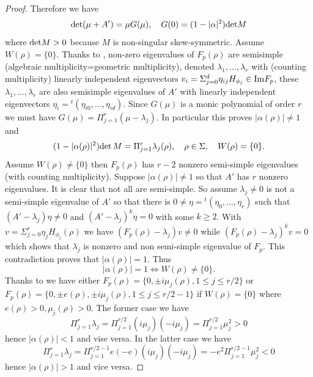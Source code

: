 \documentclass[12pt,leqno]{article} %
\def\al{\alpha}
\numberwithin{equation}{section}
\begin{document}
\begin{proof}
%
Therefore we have
%
\begin{equation}
\label{eq:det:A}
{\rm det}(\mu+A')=\mu G(\mu),\quad G(0)=(1-|\al|^2){\rm det}M
\end{equation}
%
where  ${\rm det}M>0$ because $M$ is non-singular skew-symmetric. 
Assume $W(\rho)=\{0\}$. Thanks to \cite[Lemma 1.4.4 ]{MR492751}, non-zero eigenvalues of $F_p(\rho)$ are semisimple (algebraic multiplicity=geometric multiplicity), denoted  $\lambda_1,\ldots,\lambda_r$ with (counting multiplicity) linearly independent eigenvectors $v_i=\Sigma_{j=0}^d\eta_{ij}H_{\phi_j}\in 
{\rm Im}F_p$, these  $\lambda_1,\ldots,\lambda_r$ are also semisimple eigenvalues of 
$A'$ with linearly independent eigenvectors $\eta_i={^t}(\eta_{i0},\ldots,\eta_{id})$. Since $G(\mu)$ is a monic polynomial of order $r$ we must have $G(\mu)=\Pi_{j=1}^r(\mu-\lambda_j)$. In particular this proves $|\al(\rho)|\neq 1$ and 
%
\begin{equation}
\label{eq:kankei}
(1-|\al(\rho)|^2){\rm det}\,M=\Pi_{j=1}^r \lambda_j(\rho),\quad \rho\in \Sigma,\quad W(\rho)=\{0\}.
\end{equation}
%
Assume $W(\rho)\neq \{0\}$ then $F_p(\rho)$ has $r-2$ nonzero semi-simple eigenvalues (with counting multiplicity). Suppose $|\al(\rho)|\neq 1$ so that $A'$ has $r$ nonzero eigenvalues.
It is clear that not all are semi-simple. So assume  $\lambda_j\neq 0$ is not a semi-simple eigenvalue of $A'$ so that there is $0\neq \eta={^t}(\eta_0,\ldots, \eta_r)$ such that $(A'-\lambda_j)\eta\neq 0$ and $(A'-\lambda_j)^k\eta=0$ with some $k\geq 2$. With $v=\Sigma_{j=0}^r\eta_jH_{\phi_j}(\rho)$ we have $(F_p(\rho)-\lambda_j)v\neq 0$ while $(F_p(\rho)-\lambda_j)^kv= 0$ which shows that $\lambda_j$ is nonzero and non semi-simple eigenvalue of $F_p$. This contradiction proves that $|\al(\rho)|=1$. Thus
%
\begin{equation}
\label{eq:kankei:2}
|\al(\rho)|=1\Longleftrightarrow W(\rho)\neq \{0\}.
\end{equation}
%
Thanks to \cite[Theorem 1.4.6]{MR492751}  we have either $F_p(\rho)=\{0,\pm i\mu_j(\rho), 1\leq j\leq r/2\}$ or $F_p(\rho)=\{0,\pm e(\rho), \pm i\mu_j(\rho), 1\leq j\leq r/2-1\}$ if $W(\rho)=\{0\}$ where $e(\rho)>0, \mu_j(\rho)>0$. The former case we have
%
\[
\Pi_{j=1}^r\lambda_j=\Pi_{j=1}^{r/2}(i\mu_j)(-i\mu_j)=\Pi_{j=1}^{r/2}\mu_j^2>0
\]
%
hence $|\al(\rho)|<1$ and vise versa. In the latter case we have
%
\[
\Pi_{j=1}^r\lambda_j=\Pi_{j=1}^{r/2-1}e(-e)(i\mu_j)(-i\mu_j)=-e^2\Pi_{j=1}^{r/2-1}\mu_j^2<0
\]
%
hence $|\al(\rho)|>1$ and vice versa.


\end{proof}
\end{document}
